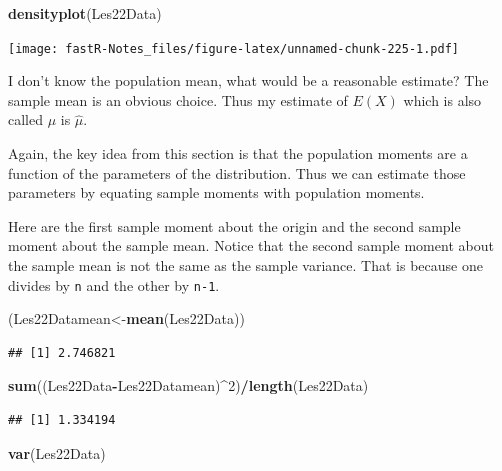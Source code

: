 \documentclass[]{book}
\newenvironment{Shaded}{\begin{snugshade}}{\end{snugshade}}
\newcommand{\KeywordTok}[1]{\textcolor[rgb]{0.13,0.29,0.53}{\textbf{#1}}}
\newcommand{\DecValTok}[1]{\textcolor[rgb]{0.00,0.00,0.81}{#1}}
\newcommand{\OperatorTok}[1]{\textcolor[rgb]{0.81,0.36,0.00}{\textbf{#1}}}
\newcommand{\NormalTok}[1]{#1}
\theoremstyle{definition}
\theoremstyle{definition}
\theoremstyle{definition}
\theoremstyle{remark}
\begin{document}
\begin{Shaded}
\begin{Highlighting}[]
\KeywordTok{densityplot}\NormalTok{(Les22Data)}
\end{Highlighting}
\end{Shaded}

\texttt{[image: fastR-Notes\_files/figure-latex/unnamed-chunk-225-1.pdf]}

I don't know the population mean, what would be a reasonable estimate?
The sample mean is an obvious choice. Thus my estimate of \(E(X)\) which
is also called \(\mu\) is \(\hat{\mu}\).

Again, the key idea from this section is that the population moments are
a function of the parameters of the distribution. Thus we can estimate
those parameters by equating sample moments with population moments.

Here are the first sample moment about the origin and the second sample
moment about the sample mean. Notice that the second sample moment about
the sample mean is not the same as the sample variance. That is because
one divides by \texttt{n} and the other by \texttt{n-1}.

\begin{Shaded}
\begin{Highlighting}[]
\NormalTok{(Les22Datamean<-}\KeywordTok{mean}\NormalTok{(Les22Data))}
\end{Highlighting}
\end{Shaded}

\begin{verbatim}
## [1] 2.746821
\end{verbatim}

\begin{Shaded}
\begin{Highlighting}[]
\KeywordTok{sum}\NormalTok{((Les22Data}\OperatorTok{-}\NormalTok{Les22Datamean)}\OperatorTok{^}\DecValTok{2}\NormalTok{)}\OperatorTok{/}\KeywordTok{length}\NormalTok{(Les22Data)}
\end{Highlighting}
\end{Shaded}

\begin{verbatim}
## [1] 1.334194
\end{verbatim}

\begin{Shaded}
\begin{Highlighting}[]
\KeywordTok{var}\NormalTok{(Les22Data)}
\end{Highlighting}
\end{Shaded}
\end{document}
